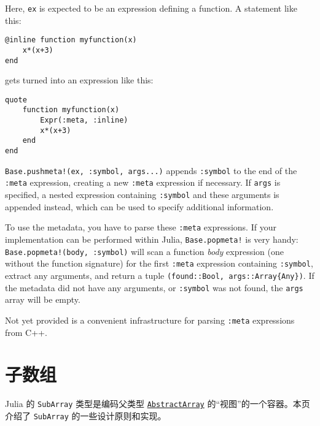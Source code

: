 Here, \texttt{ex} is expected to be an expression defining a function. A statement like this:




\begin{verbatim}
@inline function myfunction(x)
    x*(x+3)
end
\end{verbatim}



gets turned into an expression like this:




\begin{verbatim}
quote
    function myfunction(x)
        Expr(:meta, :inline)
        x*(x+3)
    end
end
\end{verbatim}



\texttt{Base.pushmeta!(ex, :symbol, args...)} appends \texttt{:symbol} to the end of the \texttt{:meta} expression, creating a new \texttt{:meta} expression if necessary. If \texttt{args} is specified, a nested expression containing \texttt{:symbol} and these arguments is appended instead, which can be used to specify additional information.



To use the metadata, you have to parse these \texttt{:meta} expressions. If your implementation can be performed within Julia, \texttt{Base.popmeta!} is very handy: \texttt{Base.popmeta!(body, :symbol)} will scan a function \emph{body} expression (one without the function signature) for the first \texttt{:meta} expression containing \texttt{:symbol}, extract any arguments, and return a tuple \texttt{(found::Bool, args::Array\{Any\})}. If the metadata did not have any arguments, or \texttt{:symbol} was not found, the \texttt{args} array will be empty.



Not yet provided is a convenient infrastructure for parsing \texttt{:meta} expressions from C++.



\hypertarget{9937121124855315153}{}


\section{子数组}



Julia 的 \texttt{SubArray} 类型是编码父类型 \hyperlink{6514416309183787338}{\texttt{AbstractArray}} 的“视图”的一个容器。本页介绍了 \texttt{SubArray} 的一些设计原则和实现。



